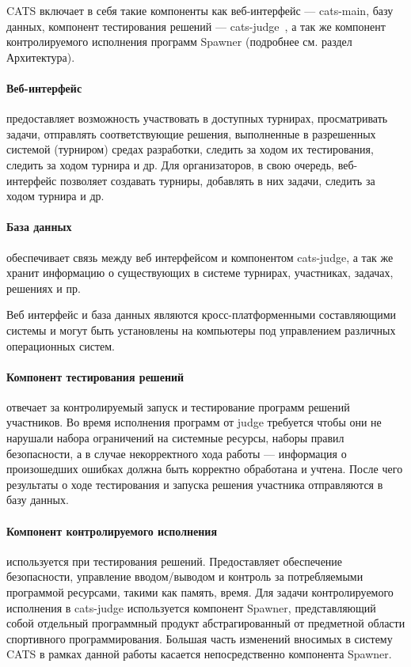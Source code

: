 \documentclass{imcs}
\begin{document}
CATS включает в себя такие компоненты как веб-интерфейс — cats-main, базу данных, компонент тестирования решений — cats-judge~\cite{rozhkov}, а так же компонент контролируемого исполнения программ Spawner (подробнее см. раздел Архитектура).

\paragraph{Веб-интерфейс} предоставляет возможность участвовать в доступных турнирах, просматривать задачи, отправлять соответствующие решения, выполненные в разрешенных системой (турниром) средах разработки, следить за ходом их тестирования, следить за ходом турнира и др. Для организаторов, в свою очередь, веб-интерфейс позволяет создавать турниры, добавлять в них задачи, следить за ходом турнира и др.

\paragraph{База данных} обеспечивает связь между веб интерфейсом и компонентом cats-judge, а так же хранит информацию о существующих в системе турнирах, участниках, задачах, решениях и пр.

Веб интерфейс и база данных являются кросс-платформенными составляющими системы и могут быть установлены на компьютеры под управлением различных операционных систем.

\paragraph{Компонент тестирования решений} отвечает за контролируемый запуск и тестирование программ решений участников. Во время исполнения программ от judge требуется чтобы они не нарушали набора ограничений на системные ресурсы, наборы правил безопасности, а в случае некорректного хода работы — информация о произошедших ошибках должна быть корректно обработана и учтена. После чего результаты о ходе тестирования и запуска решения участника отправляются в базу данных.

\paragraph{Компонент контролируемого исполнения} используется при тестирования решений. Предоставляет обеспечение безопасности, управление вводом/выводом и контроль за потребляемыми программой ресурсами, такими как память, время. Для задачи контролируемого исполнения в cats-judge используется компонент Spawner\cite{prototype}, представляющий собой отдельный программный продукт абстрагированный от предметной области спортивного программирования. Большая часть изменений вносимых в систему CATS в рамках данной работы касается непосредственно компонента Spawner.
\end{document}
